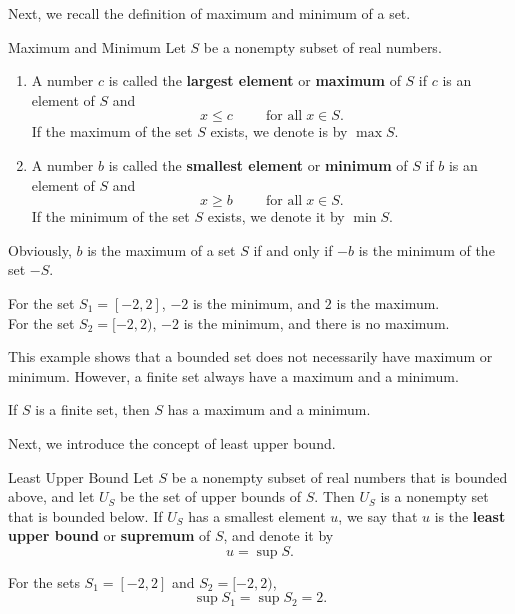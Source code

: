 Next, we recall the definition of maximum and minimum of a set.
\begin{definition}{Maximum and Minimum} Let $S$ be a nonempty subset of real numbers. 
\begin{enumerate}[1.]
\item  A number $c$ is called the {\bf largest element} or {\bf maximum} of $S$ if $c$ is an element of $S$ and
\[x\leq c\hspace{1cm}\text{for all}\;x\in S.\]
If the maximum of the set $S$ exists, we denote is by $\max S$.
\item A number $b$ is called the {\bf smallest element} or  {\bf minimum} of $S$ if $b$ is an element of $S$ and
\[x\geq b\hspace{1cm}\text{for all}\;x\in S.\]
If the minimum of the set $S$ exists, we denote it by $ \min S$.
\end{enumerate}
\end{definition}

Obviously, $b$ is the maximum of a set $S$ if and only if $-b$ is the minimum of the set $-S$.

\begin{example}{}
For the set $S_1=[-2,2]$, $-2$ is the minimum, and $2$ is the maximum.
\\
For the set $S_2=[-2, 2)$, $-2$ is the minimum, and there is no maximum.
\end{example}

This example shows that a bounded set does not necessarily have maximum or minimum.
However, a finite set always have a maximum and a minimum.

\begin{proposition}{}

If $S$ is a finite set, then $S$ has a maximum and a minimum.
\end{proposition}

 
Next, we introduce the concept of least upper bound.
\begin{definition}{Least Upper Bound}
Let $S$ be a nonempty subset of real numbers
 that is bounded above, and let $U_S$ be the set of upper bounds of $S$. Then $U_S$ is a nonempty set that is bounded below. If $U_S$ has a smallest element $u$, we say that $u$ is the {\bf least upper bound} or {\bf supremum} of $S$, and denote it by
\[u=\sup S.\]
 

\end{definition}
\begin{example}{}
For the sets $S_1=[-2,2]$ and  $S_2=[-2, 2)$, \[\sup S_1=\sup S_2=2.\]
\end{example}

